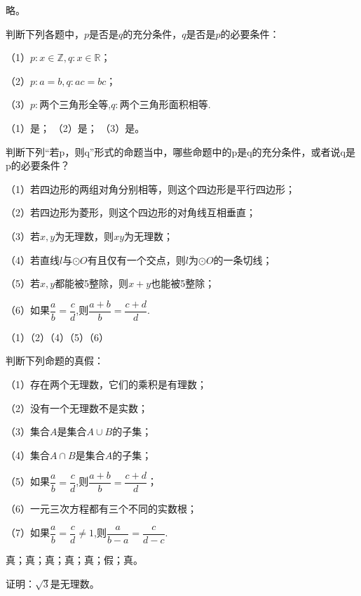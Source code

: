 \documentclass[lang=cn,newtx,10pt,scheme=chinese]{elegantbook}
\begin{document}
\begin{solution}
  略。
\end{solution}
\begin{exercise}\label{202406262010}
  判断下列各题中，$p$是否是$q$的充分条件，$q$是否是$p$的必要条件：

  （1）$p:x\in\mathbb{Z},q:x\in\mathbb{R}$；

  （2）$p:a=b,q:ac=bc$；

  （3）$p:$两个三角形全等,$q:$两个三角形面积相等.
\end{exercise}
\begin{solution}
  （1）是；
  （2）是；
  （3）是。
\end{solution}
\begin{exercise}\label{202406262101}
  判断下列“若p，则q”形式的命题当中，哪些命题中的p是q的充分条件，或者说q是p的必要条件？

  （1）若四边形的两组对角分别相等，则这个四边形是平行四边形；

  （2）若四边形为菱形，则这个四边形的对角线互相垂直；

  （3）若$x,y$为无理数，则$xy$为无理数；

  （4）若直线$l$与$\odot O$有且仅有一个交点，则$l$为$\odot O$的一条切线；

  （5）若$x,y$都能被5整除，则$x+y$也能被5整除；

  （6）如果$\dfrac{a}{b}=\dfrac{c}{d}$,则$\dfrac{a+b}{b}=\dfrac{c+d}{d}$.
\end{exercise}
\begin{solution}
  （1）（2）（4）（5）（6）
\end{solution}
\begin{exercise}\label{RJB_P26}
  判断下列命题的真假：

  （1）存在两个无理数，它们的乘积是有理数；

  （2）没有一个无理数不是实数；

  （3）集合$A$是集合$A\cup B$的子集；

  （4）集合$A\cap B$是集合$A$的子集；

  （5）如果$\dfrac ab=\dfrac cd$,则$\dfrac{a+b}b=\dfrac{c+d}{d}$；

  （6）一元三次方程都有三个不同的实数根；
  
  （7）如果$\dfrac ab=\dfrac cd\neq 1$,则$\dfrac a{b-a}=\dfrac c{d-c}$.
\end{exercise}
\begin{solution}
  真；真；真；真；真；假；真。
\end{solution}
\begin{exercise}\label{202407081520}
  证明：$\sqrt{3}$是无理数。
\end{exercise}
\end{document}
